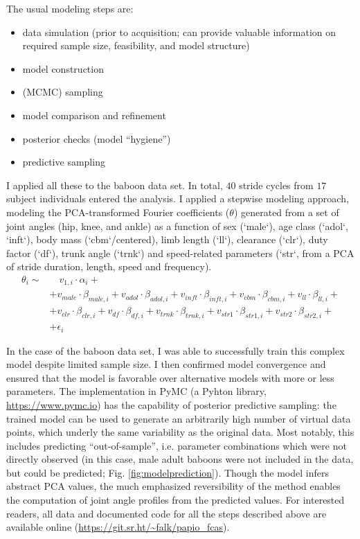 The usual modeling steps are:
\begin{itemize}
\item data simulation (prior to acquisition; can provide valuable information on required sample size, feasibility, and model structure)
\item model construction
\item (MCMC) sampling
\item model comparison and refinement
\item posterior checks (model ``hygiene'')
\item predictive sampling
\end{itemize}


I applied all these to the baboon data set.
In total, \(40\) stride cycles from \(17\) subject individuals entered the analysis.
I applied a stepwise modeling approach, modeling the PCA-transformed Fourier coefficients (\(\theta\)) generated from a set of joint angles (hip, knee, and ankle) as a function of sex (`male`), age class (`adol`, `inft`), body mass (`cbm`/centered), limb length (`ll`), clearance (`clr`), duty factor (`df`), trunk angle (`trnk`) and speed-related parameters (`str`, from a PCA of stride duration, length, speed and frequency).
\begin{equation}
\begin{split}
 \theta_{i}  \sim &\quad v_{1,i}\cdot\alpha_{i} +
\\ & + v_{male}\cdot\beta_{male,i} + v_{adol}\cdot\beta_{adol,i} + v_{inft}\cdot\beta_{inft,i} + v_{cbm}\cdot\beta_{cbm,i}+ v_{ll}\cdot\beta_{ll,i} +
\\ & + v_{clr}\cdot\beta_{clr,i} + v_{df}\cdot\beta_{df,i} + v_{trnk}\cdot\beta_{trnk,i} + v_{str1}\cdot\beta_{str1,i} + v_{str2}\cdot\beta_{str2,i} +
\\ & + \epsilon_{i}
\end{split}
 \label{eq:jap}
\end{equation}


In the case of the baboon data set, I was able to successfully train this complex model despite limited sample size.
I then confirmed model convergence and ensured that the model is favorable over alternative models with more or less parameters.
The implementation in PyMC (a Pyhton library, \url{https://www.pymc.io}) has the capability of posterior predictive sampling: the trained model can be used to generate an arbitrarily high number of virtual data points, which underly the same variability as the original data.
Most notably, this includes predicting ``out-of-sample'', i.e. parameter combinations which were not directly observed (in this case, male adult baboons were not included in the data, but could be predicted; Fig. \ref{fig:modelprediction}).
Though the model infers abstract PCA values, the much emphasized reversibility of the method enables the computation of joint angle profiles from the predicted values.
For interested readers, all data and documented code for all the steps described above are available online (\url{https://git.sr.ht/\~falk/papio\_fcas}).


